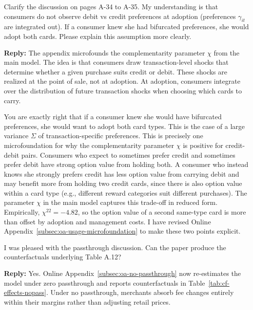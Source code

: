 \documentclass[main.tex]{subfiles}
\begin{document}
\begin{refsection}
\begin{refcommentnoclear}
Clarify the discussion on pages A-34 to A-35.
My understanding is that consumers do not observe debit vs credit preferences at adoption (preferences $\gamma_{it}$ are integrated out).
If a consumer knew she had bifurcated preferences, she would adopt both cards.
Please explain this assumption more clearly.
\end{refcommentnoclear}

\textbf{Reply:} The appendix microfounds the complementarity parameter $\chi$ from the main model.
The idea is that consumers draw transaction-level shocks that determine whether a given purchase suits credit or debit.
These shocks are realized at the point of sale, not at adoption.
At adoption, consumers integrate over the distribution of future transaction shocks when choosing which cards to carry.

You are exactly right that if a consumer knew she would have bifurcated preferences, she would want to adopt both card types.
This is the case of a large variance $\Sigma$ of transaction-specific preferences.
This is precisely one microfoundation for why the complementarity parameter $\chi$ is positive for credit-debit pairs.
Consumers who expect to sometimes prefer credit and sometimes prefer debit have strong option value from holding both.
A consumer who instead knows she strongly prefers credit has less option value from carrying debit and may benefit more from holding two credit cards, since there is also option value within a card type (e.g., different reward categories suit different purchases).
The parameter $\chi$ in the main model captures this trade-off in reduced form.
Empirically, $\chi^{22}=-4.82$, so the option value of a second same-type card is more than offset by adoption and management costs.
I have revised Online Appendix~\ref{subsec:oa-usage-microfoundation} to make these two points explicit.

\begin{refcommentnoclear}
I was pleased with the passthrough discussion.
Can the paper produce the counterfactuals underlying Table A.12?

\end{refcommentnoclear}

\textbf{Reply:} Yes.
Online Appendix~\ref{subsec:oa-no-passthrough} now re-estimates the model under zero passthrough and reports counterfactuals in Table~\ref{tab:cf-effects-nopass}.
Under no passthrough, merchants absorb fee changes entirely within their margins rather than adjusting retail prices.


\end{refsection}
\end{document}
